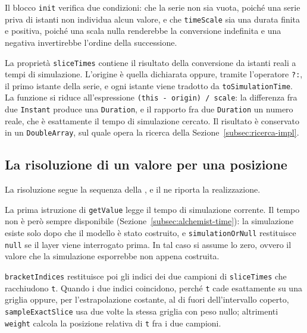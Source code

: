 

Il blocco \texttt{init} verifica due condizioni: che la serie non sia vuota, poiché una
serie priva di istanti non individua alcun valore, e che \texttt{timeScale} sia una durata
finita e positiva, poiché una scala nulla renderebbe la conversione indefinita e una
negativa invertirebbe l'ordine della successione.
 
La proprietà \texttt{sliceTimes} contiene il risultato della conversione
da istanti reali a tempi di simulazione. L'origine è quella
dichiarata oppure, tramite l'operatore \texttt{?:}, il primo istante della serie, e ogni
istante viene tradotto da \texttt{toSimulationTime}. La funzione si riduce all'espressione
\texttt{(this - origin) / scale}: la differenza fra due \texttt{Instant} produce una
\texttt{Duration}, e il rapporto fra due \texttt{Duration} un numero reale, che è
esattamente il tempo di simulazione cercato.
Il risultato è conservato in un \texttt{DoubleArray}, sul quale opera la ricerca della
Sezione~\ref{subsec:ricerca-impl}.

\subsection{La risoluzione di un valore per una posizione}
\label{subsec:interrogazione-impl}

La risoluzione segue la sequenza della , e il
 ne riporta la realizzazione.



La prima istruzione di \texttt{getValue} legge il tempo di simulazione corrente. Il tempo
non è però sempre disponibile (Sezione~\ref{subsec:alchemist-time}): la simulazione esiste
solo dopo che il modello è stato costruito, e \texttt{simulationOrNull} restituisce
\texttt{null} se il layer viene interrogato prima. In tal caso si assume lo zero,
ovvero il valore che la simulazione esporrebbe non appena costruita.
 
\texttt{bracketIndices} restituisce poi gli indici dei due campioni di \texttt{sliceTimes}
che racchiudono \texttt{t}. Quando i due indici coincidono, perché \texttt{t} cade
esattamente su una griglia oppure, per l'estrapolazione costante, al di fuori
dell'intervallo coperto, \texttt{sampleExactSlice} usa due volte la stessa griglia con peso
nullo; altrimenti \texttt{weight} calcola la posizione relativa di \texttt{t} fra i due
campioni.
 
